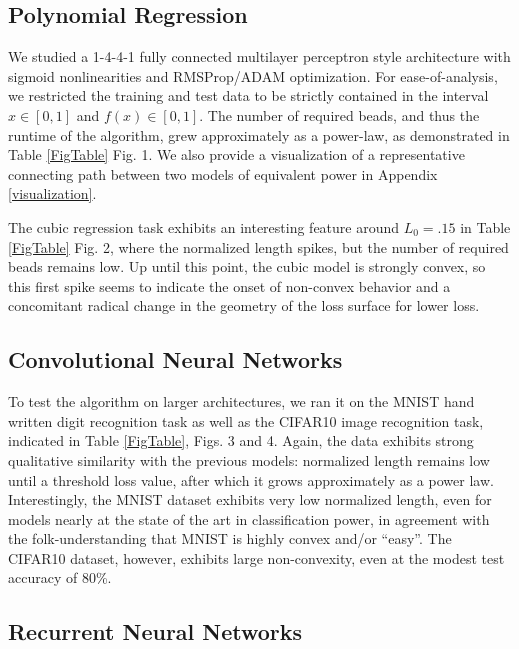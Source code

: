 \subsection{Polynomial Regression}
\label{sec:PolyFuncs}

 We studied a 1-4-4-1 fully connected multilayer perceptron style architecture with sigmoid nonlinearities and RMSProp/ADAM optimization.  For ease-of-analysis, we restricted the training and test data to be strictly contained in the interval $x\in[0,1]$ and $f(x)\in[0,1]$.  The number of required beads, and thus the runtime of the algorithm, grew approximately as a power-law, as demonstrated in Table \ref{FigTable} Fig. 1.  We also provide a visualization of a representative connecting path between two models of equivalent power in Appendix \ref{visualization}.
 
 The cubic regression task exhibits an interesting feature around $L_0=.15$ in Table \ref{FigTable} Fig. 2, where the normalized length spikes, but the number of required beads remains low.  Up until this point, the cubic model is strongly convex, so this first spike seems to indicate the onset of non-convex behavior and a concomitant radical change in the geometry of the loss surface for lower loss.
  
 
\subsection{Convolutional Neural Networks}
\label{sec:CNN}

 To test the algorithm on larger architectures, we ran it on the MNIST hand written digit recognition task as well as the CIFAR10 image recognition task, indicated in Table \ref{FigTable}, Figs. 3 and 4.  Again, the data exhibits strong qualitative similarity with the previous models: normalized length remains low until a threshold loss value, after which it grows approximately as a power law.  Interestingly, the MNIST dataset exhibits very low normalized length, even for models nearly at the state of the art in classification power, in agreement with the folk-understanding that MNIST is highly convex and/or ``easy''.  The CIFAR10 dataset, however, exhibits large non-convexity, even at the modest test accuracy of 80\%.


\subsection{Recurrent Neural Networks}

